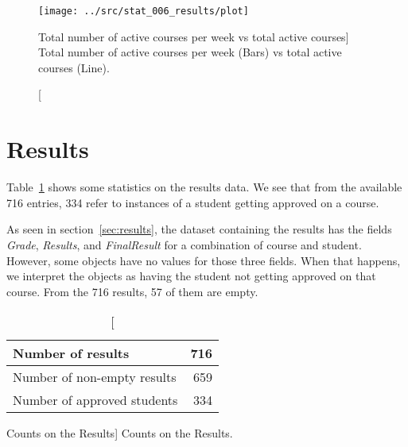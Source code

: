 \begin{figure}[h!]
    \centering

    \texttt{[image: ../src/stat\_006\_results/plot]}

    \caption
        [Total number of active courses per week vs total active courses]
        {Total number of active courses per week (Bars) vs total active courses (Line).}

    \label{fig:stat_006}
\end{figure}

\section{Results}

Table~\ref{tab:results_stats} shows some statistics on the results data. We see
that from the available 716 entries, 334 refer to instances of a student
getting approved on a course.

As seen in section~\ref{sec:results}, the dataset containing the results has
the fields \textit{Grade}, \textit{Results}, and \textit{FinalResult} for a
combination of course and student. However, some objects have no values for
those three fields. When that happens, we interpret the objects as having the
student not getting approved on that course. From the 716 results, 57 of them
are empty.

\begin{table}[h!]
    \centering

    \begin{tabular}{| l | r |}
        \hline
        Number of results           & 716 \\ \hline
        Number of non-empty results & 659  \\ \hline
        Number of approved students & 334 \\ \hline
    \end{tabular}

    \caption
        [Counts on the Results]
        {Counts on the Results.}

    \label{tab:results_stats}
\end{table}
